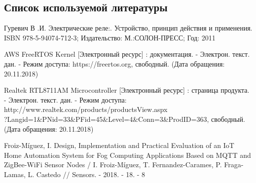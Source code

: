 \subsection{ Список используемой литературы}
\begin{my_enumerate}

\item
Гуревич В .И. Электрические реле:. Устройство, принцип действия и применения. ISBN 978-5-94074-712-3; Издательство: М.:СОЛОН-ПРЕСС; Год: 2011 \\

\item
AWS FreeRTOS Kernel  [Электронный ресурс] : документация. - Электрон. текст. дан. - Режим доступа: https://freertos.org, свободный. (Дата обращения: 20.11.2018) \\

\item 	
Realtek RTL8711AM Microcontroller [Электронный ресурс] : страница продукта. - Электрон. текст. дан. - Режим доступа: http://www.realtek.com/products/productsView.aspx \\ 
?Langid=1\&PNid=33\&PFid=45\&Level=4\&Conn=3\&ProdID=363, свободный. (Дата обращения: 20.11.2018) \\

\item Froiz-Míguez, I. Design, Implementation and Practical Evaluation of an IoT Home Automation System for Fog Computing Applications Based on MQTT and ZigBee-WiFi Sensor Nodes / I. Froiz-Míguez, T. Fernandez-Carames, P. Fraga-Lamas, L. Castedo // Sensors. - 2018. - 18. - 8

\end{my_enumerate}


